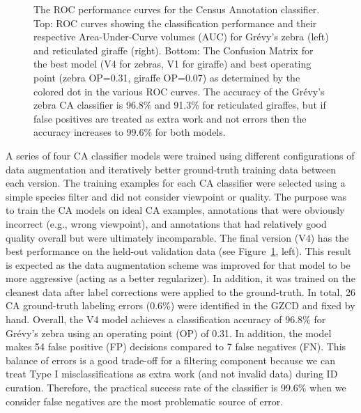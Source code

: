 \begin{figure}[!t]
\begin{center}
    \end{center}
    \caption{The ROC performance curves for the Census Annotation classifier.  Top: ROC curves showing the classification performance and their respective Area-Under-Curve volumes (AUC) for Gr\'evy's zebra (left) and reticulated giraffe (right).  Bottom: The Confusion Matrix for the best model (V4 for zebras, V1 for giraffe) and best operating point (zebra OP=0.31, giraffe OP=0.07) as determined by the colored dot in the various ROC curves.  The accuracy of the Gr\'evy's zebra CA classifier is 96.8\% and 91.3\% for reticulated giraffes, but if false positives are treated as extra work and not errors then the accuracy increases to 99.6\% for both models.}
    \label{fig:ca-census_classifier}
\end{figure}

A series of four CA classifier models were trained using different configurations of data augmentation and iteratively better ground-truth training data between each version.  The training examples for each CA classifier were selected using a simple species filter and did not consider viewpoint or quality.  The purpose was to train the CA models on ideal CA examples, annotations that were obviously incorrect (e.g., wrong viewpoint), and annotations that had relatively good quality overall but were ultimately incomparable.  The final version (V4) has the best performance on the held-out validation data (see Figure~\ref{fig:ca-census_classifier}, left). This result is expected as the data augmentation scheme was improved for that model to be more aggressive (acting as a better regularizer). In addition, it was trained on the cleanest data after label corrections were applied to the ground-truth.  In total, 26 CA ground-truth labeling errors (0.6\%) were identified in the GZCD and fixed by hand.  Overall, the V4 model achieves a classification accuracy of 96.8\% for Gr\'evy's zebra using an operating point (OP) of 0.31. In addition, the model makes 54 false positive (FP) decisions compared to 7 false negatives (FN).  This balance of errors is a good trade-off for a filtering component because we can treat Type I misclassifications as extra work (and not invalid data) during ID curation.  Therefore, the practical success rate of the classifier is 99.6\% when we consider false negatives are the most problematic source of error.

